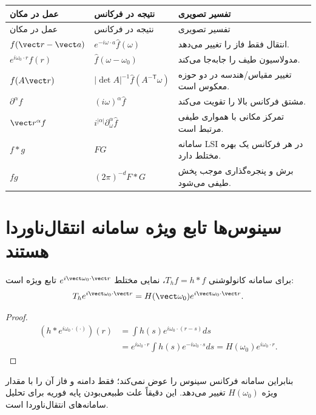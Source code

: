 \begin{longtable}{p{}p{}p{}}
\toprule
عمل در مکان & نتیجه در فرکانس & تفسیر تصویری\\
\midrule
\endfirsthead
\toprule
عمل در مکان & نتیجه در فرکانس & تفسیر تصویری\\
\midrule
\endhead
\(f(\vect r-\vect a)\) & \(e^{-i\omega\cdot a}\widehat f(\omega)\) & انتقال فقط فاز را تغییر می‌دهد.\\
\(e^{i\omega_0\cdot r}f(r)\) & \(\widehat f(\omega-\omega_0)\) & مدولاسیون طیف را جابه‌جا می‌کند.\\
\(f(A\vect r)\) & \(|\det A|^{-1}\widehat f(A^{-\mathsf T}\omega)\) & تغییر مقیاس/هندسه در دو حوزه معکوس است.\\
\(\partial^\alpha f\) & \((i\omega)^\alpha\widehat f\) & مشتق فرکانس بالا را تقویت می‌کند.\\
\(\vect r^\alpha f\) & \(i^{|\alpha|}\partial_\omega^\alpha\widehat f\) & تمرکز مکانی با همواری طیفی مرتبط است.\\
\(f*g\) & \(FG\) & سامانه LSI در هر فرکانس یک بهره مختلط دارد.\\
\(fg\) & \((2\pi)^{-d}F*G\) & برش و پنجره‌گذاری موجب پخش طیفی می‌شود.\\
\bottomrule
\end{longtable}

\section{سینوس‌ها تابع ویژه سامانه انتقال‌ناوردا هستند}

\begin{theorem}
برای سامانه کانولوشنی \(T_h f=h*f\)، نمایی مختلط \(e^{i\vect\omega_0\cdot\vect r}\) تابع ویژه است:
\begin{equation}
T_h e^{i\vect\omega_0\cdot\vect r}
=H(\vect\omega_0)e^{i\vect\omega_0\cdot\vect r}.
\label{eq:sin-eigen}
\end{equation}
\end{theorem}

\begin{proof}
\begin{align}
(h*e^{i\omega_0\cdot(\cdot)})(r)
&=\int h(s)e^{i\omega_0\cdot(r-s)}ds\\
&=e^{i\omega_0\cdot r}\int h(s)e^{-i\omega_0\cdot s}ds
=H(\omega_0)e^{i\omega_0\cdot r}.
\end{align}
\end{proof}

بنابراین سامانه فرکانس سینوس را عوض نمی‌کند؛ فقط دامنه و فاز آن را با مقدار ویژه \(H(\omega_0)\)
تغییر می‌دهد. این دقیقاً علت طبیعی‌بودن پایه فوریه برای تحلیل سامانه‌های انتقال‌ناوردا است.


